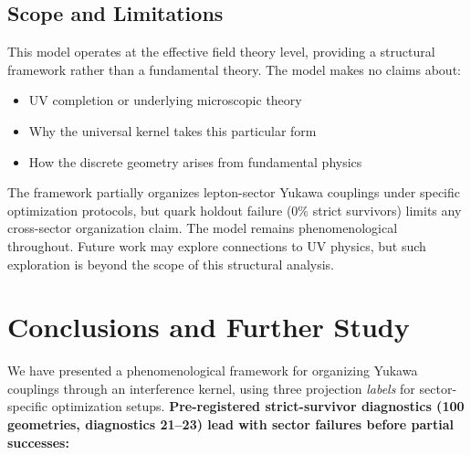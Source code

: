 \documentclass[12pt,a4paper]{article}
\begin{document}
\subsection{Scope and Limitations}

This model operates at the effective field theory level, providing a structural framework rather than a fundamental theory. The model makes no claims about:
\begin{itemize}
\item UV completion or underlying microscopic theory
\item Why the universal kernel takes this particular form
\item How the discrete geometry arises from fundamental physics
\end{itemize}

The framework partially organizes lepton-sector Yukawa couplings under specific optimization protocols, but quark holdout failure (0\% strict survivors) limits any cross-sector organization claim. The model remains phenomenological throughout. Future work may explore connections to UV physics, but such exploration is beyond the scope of this structural analysis.

\section{Conclusions and Further Study}

We have presented a phenomenological framework for organizing Yukawa couplings through an interference kernel, using three projection \emph{labels} for sector-specific optimization setups. \textbf{Pre-registered strict-survivor diagnostics (100 geometries, diagnostics 21--23) lead with sector failures before partial successes:}
\end{document}
